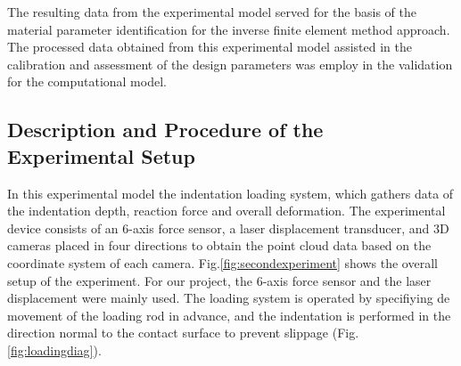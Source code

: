 
The resulting data from the experimental model served for the basis of the material 
parameter identification for the inverse finite element method approach.
The processed data obtained from this experimental model assisted in the calibration 
and assessment of the design parameters was employ in the validation for the 
computational model. 

\subsection*{Description and Procedure of the Experimental Setup}

In this experimental model the indentation loading system, which gathers data of the indentation 
depth, reaction force and overall deformation. 
The experimental device consists of an 6-axis force sensor, a laser displacement transducer,
 and 3D cameras placed in four directions to obtain the point cloud data based on the 
 coordinate system of each camera. Fig.\ref{fig:secondexperiment} shows the overall setup of the 
 experiment. For our project, the 6-axis force sensor and the laser displacement were mainly used.
The loading system is operated by specifiying de movement of the loading rod in advance, and the 
indentation is performed in the direction normal to the contact surface to prevent slippage (Fig. \ref{fig:loadingdiag}).\\


